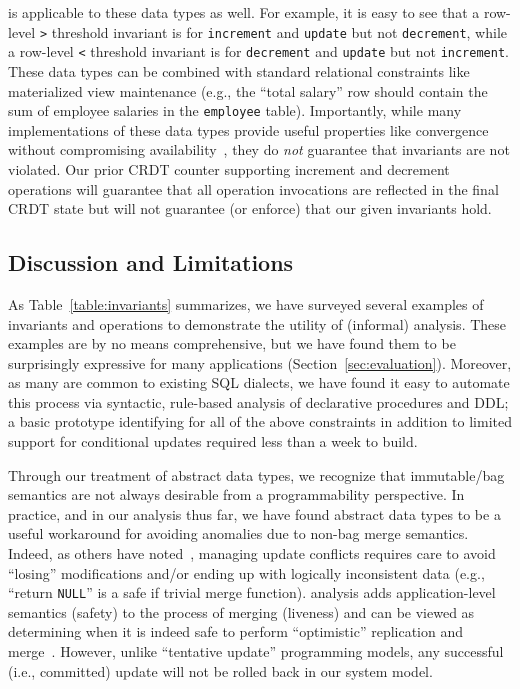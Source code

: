 \iconfluence is applicable to these data types as well. For example,
it is easy to see that a row-level \texttt{>} threshold invariant is
\iconfluent for \texttt{increment} and \texttt{update} but not
\texttt{decrement}, while a row-level \texttt{<} threshold invariant
is \iconfluent for \texttt{decrement} and \texttt{update} but not
\texttt{increment}. These data types can be combined with standard
relational constraints like materialized view maintenance (e.g., the
``total salary'' row should contain the sum of employee salaries in
the \texttt{employee} table). Importantly, while many implementations
of these data types provide useful properties like convergence without
compromising availability~\cite{blooml,crdt}, they do \textit{not}
guarantee that invariants are not violated. Our prior CRDT counter
supporting increment and decrement operations will guarantee that all
operation invocations are reflected in the final CRDT state but will
not guarantee (or enforce) that our given invariants hold.

\subsection{Discussion and Limitations}

As Table~\ref{table:invariants} summarizes, we have surveyed several
examples of invariants and operations to demonstrate the utility of
(informal) \iconfluence analysis. These examples are by no means
comprehensive, but we have found them to be surprisingly expressive
for many applications (Section~\ref{sec:evaluation}). Moreover, as
many are common to existing SQL dialects, we have found it easy to
automate this process via syntactic, rule-based analysis of
declarative procedures and DDL; a basic prototype identifying
\iconfluence for all of the above constraints in addition to limited
support for conditional updates required less than a week to build.

Through our treatment of abstract data types, we recognize that
immutable/bag semantics are not always desirable from a
programmability perspective. In practice, and in our analysis thus
far, we have found abstract data types to be a useful workaround for
avoiding anomalies due to non-bag merge semantics. Indeed, as others
have noted~\cite{bayou,gray-book}, managing update conflicts requires
care to avoid ``losing'' modifications and/or ending up with logically
inconsistent data (e.g., ``return \texttt{NULL}'' is a safe if trivial
merge function). \iconfluence analysis adds application-level
semantics (safety) to the process of merging (liveness) and can be
viewed as determining when it is indeed safe to perform ``optimistic''
replication and merge~\cite{optimistic}. However, unlike ``tentative
update'' programming models, any successful (i.e., committed) update
will not be rolled back in our system model.

